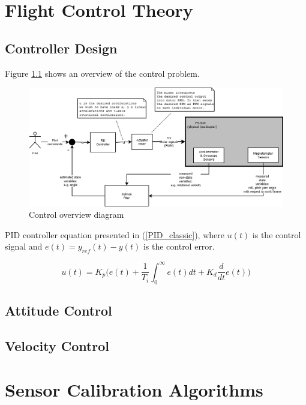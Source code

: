 \documentclass[a4paper]{report}
\begin{document}
\chapter{Flight Control Theory}

	\section{Controller Design}

Figure \ref{fig:controloverview} shows an overview of the control problem.

\begin{figure}[h]
    \centering
    \includegraphics[scale=0.3]{images/ControlDiagram.png}
    \caption{Control overview diagram}
    \label{fig:controloverview}
\end{figure}
	
PID controller equation presented in (\ref{PID_classic}), where $u(t)$ is the control signal and $e(t) = y_{ref}(t) - y(t)$ is the control error.

\begin{equation}
u(t) = K_p \bigg( e(t) + \dfrac{1}{T_i} \int_{0}^{\infty}  e(t) dt + K_d \dfrac{d}{dt} e(t) \bigg)
\label{PID_classic}
\end{equation}

	\section{Attitude Control}

	\section{Velocity Control}

\chapter{Sensor Calibration Algorithms}
\end{document}
